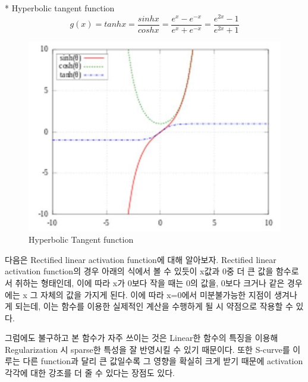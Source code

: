 \documentclass[draft=false]{oblivoir}
\begin{document}
* Hyperbolic tangent function
\begin{equation}
g(x) = tanhx = \frac{sinhx}{coshx} = \frac{e^{x}-e^{-x}}{e^{x}+e^{-x}} = \frac{e^{2x}-1}{e^{2x}+1}
\label{eq:14-2-7}
\end{equation}
\begin{figure}[ht] \centering 
\includegraphics[scale=0.4]{fig14_7.png} 
\caption{Hyperbolic Tangent function}
\label{fig:14-7}
\end{figure}

다음은 Rectified linear activation function에 대해 알아보자. Rectified linear activation function의 경우 아래의 식에서 볼 수 있듯이 x값과 0중 더 큰 값을 함수로서 취하는 형태인데, 이에 따라 x가 0보다 작을 때는 0의 값을, 0보다 크거나 같은 경우에는 x 그 자체의 값을 가지게 된다. 이에 따라 x=0에서 미분불가능한 지점이 생겨나게 되는데, 이는 함수를 이용한 실제적인 계산을 수행하게 될 시 약점으로 작용할 수 있다. 

그럼에도 불구하고 본 함수가 자주 쓰이는 것은 Linear한 함수의 특징을 이용해 Regularization 시 sparse한 특성을 잘 반영시킬 수 있기 때문이다. 또한 S-curve를 이루는 다른 function과 달리 큰 값일수록 그 영향을 확실히 크게 받기 때문에 activation 각각에 대한 강조를 더 줄 수 있다는 장점도 있다. 
\end{document}
